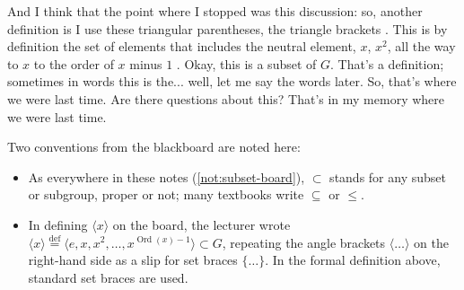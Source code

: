 \begin{speech}[00:03:18 - 00:04:05]
And I think that the point where I stopped was this discussion: so, another definition is I use these triangular parentheses, the triangle brackets . This is by definition the set of elements that includes the neutral element, $x$, $x^2$, all the way to $x$ to the order of $x$ minus $1$ . Okay, this is a subset of $G$. That's a definition; sometimes in words this is the... well, let me say the words later. So, that's where we were last time. Are there questions about this? That's in my memory where we were last time.
\end{speech}

\begin{content}

\end{content}

\begin{aiNote}
Two conventions from the blackboard are noted here:
\begin{itemize}
    \item As everywhere in these notes (\cref{not:subset-board}), $\subset$ stands for any subset or subgroup, proper or not; many textbooks write $\subseteq$ or $\le$.
    \item In defining $\langle x \rangle$ on the board, the lecturer wrote $\langle x \rangle \stackrel{\text{def}}{=} \langle e, x, x^2, \dots, x^{\operatorname{Ord}(x)-1} \rangle \subset G$, repeating the angle brackets $\langle \dots \rangle$ on the right-hand side as a slip for set braces $\{ \dots \}$. In the formal definition above, standard set braces are used.
\end{itemize}
\end{aiNote}

